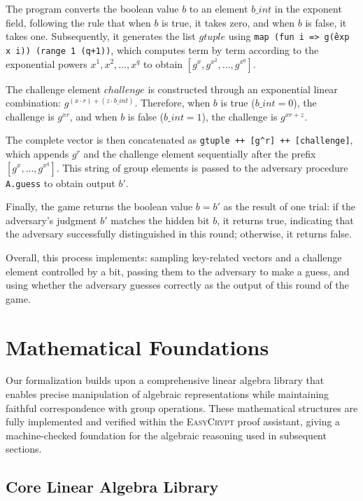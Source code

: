 The program converts the boolean value $b$ to an element $b\_int$ in the exponent field, following the rule that when $b$ is true, it takes zero, and when $b$ is false, it takes one. Subsequently, it generates the list $gtuple$ using \texttt{map (fun i => g\^(exp x i)) (range 1 (q+1))}, which computes term by term according to the exponential powers $x^1, x^2, \ldots, x^q$ to obtain $[g^x, g^{x^2}, \ldots, g^{x^q}]$.

The challenge element $challenge$ is constructed through an exponential linear combination: $g^{(x \cdot r) + (z \cdot b\_int)}$. Therefore, when $b$ is true ($b\_int = 0$), the challenge is $g^{xr}$, and when $b$ is false ($b\_int = 1$), the challenge is $g^{xr+z}$.

The complete vector is then concatenated as \texttt{gtuple ++ [g\^{}r] ++ [challenge]}, which appends $g^r$ and the challenge element sequentially after the prefix $[g^x, \ldots, g^{x^q}]$. This string of group elements is passed to the adversary procedure \texttt{A.guess} to obtain output $b'$.

Finally, the game returns the boolean value $b = b'$ as the result of one trial: if the adversary's judgment $b'$ matches the hidden bit $b$, it returns true, indicating that the adversary successfully distinguished in this round; otherwise, it returns false.

Overall, this process implements: sampling key-related vectors and a challenge element controlled by a bit, passing them to the adversary to make a guess, and using whether the adversary guesses correctly as the output of this round of the game.

\section{Mathematical Foundations}
\label{sec:mathematical-foundations}

Our formalization builds upon a comprehensive linear algebra library that enables precise manipulation of algebraic representations while maintaining faithful correspondence with group operations.
These mathematical structures are fully implemented and verified within the \textsc{EasyCrypt} proof assistant, giving a machine-checked foundation for the algebraic reasoning used in subsequent sections.
\subsection{Core Linear Algebra Library}

